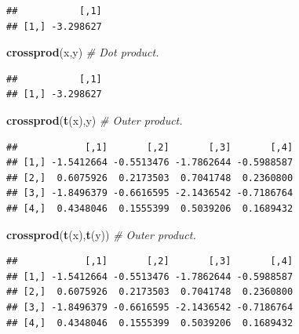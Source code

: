 \documentclass[]{book}
\newenvironment{Shaded}{\begin{snugshade}}{\end{snugshade}}
\newcommand{\CommentTok}[1]{\textcolor[rgb]{0.56,0.35,0.01}{\textit{#1}}}
\newcommand{\KeywordTok}[1]{\textcolor[rgb]{0.13,0.29,0.53}{\textbf{#1}}}
\newcommand{\NormalTok}[1]{#1}
\newcommand{\OperatorTok}[1]{\textcolor[rgb]{0.81,0.36,0.00}{\textbf{#1}}}
\newcommand{\StringTok}[1]{\textcolor[rgb]{0.31,0.60,0.02}{#1}}
\theoremstyle{definition}
\theoremstyle{definition}
\theoremstyle{definition}
\theoremstyle{remark}
\begin{document}
\begin{Shaded}
\end{Shaded}

\begin{verbatim}
##           [,1]
## [1,] -3.298627
\end{verbatim}

\begin{Shaded}
\begin{Highlighting}[]
\KeywordTok{crossprod}\NormalTok{(x,y) }\CommentTok{# Dot product.}
\end{Highlighting}
\end{Shaded}

\begin{verbatim}
##           [,1]
## [1,] -3.298627
\end{verbatim}

\begin{Shaded}
\begin{Highlighting}[]
\KeywordTok{crossprod}\NormalTok{(}\KeywordTok{t}\NormalTok{(x),y) }\CommentTok{# Outer product.}
\end{Highlighting}
\end{Shaded}

\begin{verbatim}
##            [,1]       [,2]       [,3]       [,4]
## [1,] -1.5412664 -0.5513476 -1.7862644 -0.5988587
## [2,]  0.6075926  0.2173503  0.7041748  0.2360800
## [3,] -1.8496379 -0.6616595 -2.1436542 -0.7186764
## [4,]  0.4348046  0.1555399  0.5039206  0.1689432
\end{verbatim}

\begin{Shaded}
\begin{Highlighting}[]
\KeywordTok{crossprod}\NormalTok{(}\KeywordTok{t}\NormalTok{(x),}\KeywordTok{t}\NormalTok{(y)) }\CommentTok{# Outer product.}
\end{Highlighting}
\end{Shaded}

\begin{verbatim}
##            [,1]       [,2]       [,3]       [,4]
## [1,] -1.5412664 -0.5513476 -1.7862644 -0.5988587
## [2,]  0.6075926  0.2173503  0.7041748  0.2360800
## [3,] -1.8496379 -0.6616595 -2.1436542 -0.7186764
## [4,]  0.4348046  0.1555399  0.5039206  0.1689432
\end{verbatim}
\end{document}

